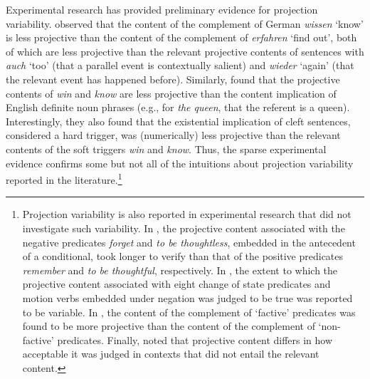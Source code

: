 \documentclass[11pt,fleqn]{article}
\newcommand{\6}{\mbox{$[\hspace*{-.6mm}[$}}
\newcommand{\9}{\mbox{$]\hspace*{-.6mm}]$}}
\begin{document}
Experimental research has provided preliminary evidence for projection variability. \citet{xue-onea11} observed that the content of the complement of German {\em wissen} `know' is less projective than the content of the complement of {\em erfahren} `find out', both of which are less projective than the relevant projective contents of sentences with {\em auch} `too' (that a parallel event is contextually salient) and {\em wieder} `again' (that the relevant event has happened before). Similarly, \citet{smith-hall11} found that the projective contents of {\em win} and {\em know} are less projective than the content implication of English definite noun phrases (e.g., for {\em the queen}, that the referent is a queen). Interestingly, they also found that the existential implication of cleft sentences, considered a hard trigger, was (numerically) less projective than the relevant contents of the soft triggers {\em win} and {\em know}. Thus, the sparse experimental evidence confirms some but not all of the intuitions about projection variability reported in the literature.\footnote{Projection variability is also reported in experimental research that did not investigate such variability. In \citealt{just-clark1973}, the projective content associated with the negative predicates {\em forget} and {\em to be thoughtless}, embedded in the antecedent of a conditional, took longer to verify than that of the positive predicates {\em remember} and {\em to be thoughtful}, respectively. In \citealt{harris1974}, the extent to which the projective content associated with eight change of state predicates and motion verbs embedded under negation was judged to be true was reported to be variable. In \citealt{harris1974b}, the content of the complement of `factive' predicates was found to be more projective than the content of the complement of `non-factive' predicates. Finally, \citet{tiemann-etal11} noted that projective content differs in how acceptable it was judged in contexts that did not entail the relevant content.}
\end{document}
